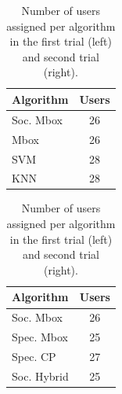 \begin{table}[t!]
\centering
\begin{minipage}{1.5in}
\begin{tabular}{| l | c |}
\hline
{\bf Algorithm} & {\bf Users} \\
\hline
Soc. Mbox & 26\\
Mbox  & 26 \\
SVM & 28 \\
KNN & 28 \\
\hline
\end{tabular}
  \end{minipage}
  \begin{minipage}{1.3in}
\begin{tabular}{| l | c |}
\hline
{\bf Algorithm} & {\bf Users} \\
\hline
Soc. Mbox & 26\\
Spec. Mbox  & 25 \\
Spec. CP & 27 \\
Soc. Hybrid & 25 \\
\hline
\end{tabular}
  \end{minipage}
\caption{Number of users assigned per algorithm in the first trial (left)
and second trial (right).}
\label{tab:Assigned1}
\end{table}

